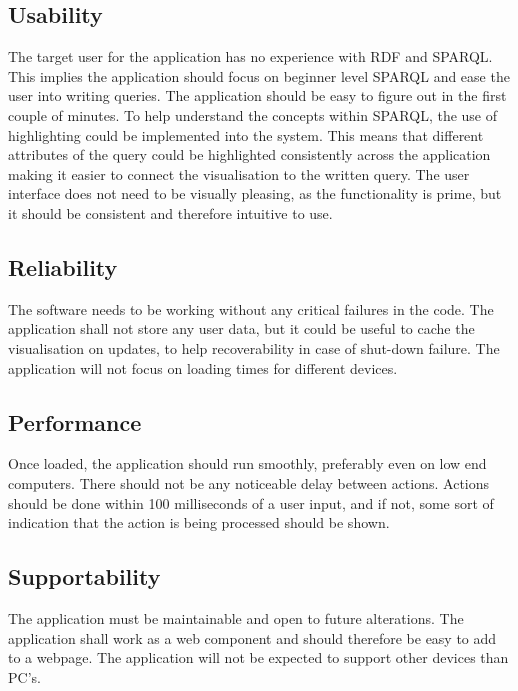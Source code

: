 \subsection{Usability}
The target user for the application has no experience with RDF and SPARQL. This implies the application should focus on beginner level SPARQL and ease the user into writing queries. The application should be easy to figure out in the first couple of minutes. To help understand the concepts within SPARQL, the use of highlighting could be implemented into the system. This means that different attributes of the query could be highlighted consistently across the application making it easier to connect the visualisation to the written query. The user interface does not need to be visually pleasing, as the functionality is prime, but it should be consistent and therefore intuitive to use.

\subsection{Reliability}
The software needs to be working without any critical failures in the code. The application shall not store any user data, but it could be useful to cache the visualisation on updates, to help recoverability in case of shut-down failure. The application will not focus on loading times for different devices.

\subsection{Performance}
Once loaded, the application should run smoothly, preferably even on low end computers. There should not be any noticeable delay between actions. Actions should be done within 100 milliseconds of a user input, and if not, some sort of indication that the action is being processed should be shown.

\subsection{Supportability}
The application must be maintainable and open to future alterations. The application shall work as a web component and should therefore be easy to add to a webpage. The application will not be expected to support other devices than PC’s.